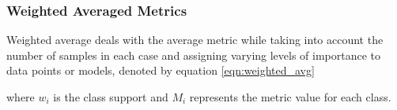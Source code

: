\subsubsection{Weighted Averaged Metrics}
Weighted average deals with the average metric while taking into
account the number of samples in each case and assigning varying
levels of importance to data points or models, denoted by equation
\ref{eqn:weighted_avg}

where $w_i$ is the class support and $M_i$ represents the metric value for
each class.
